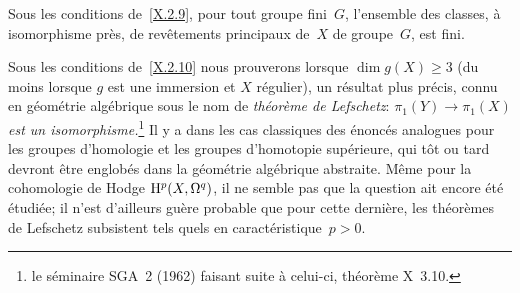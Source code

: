 \begin{corollaire}
\label{X.2.12}
Sous
les conditions de~\ref{X.2.9}, pour tout
groupe fini~$G$, l'ensemble des classes, \`a isomorphisme pr\`es,
de rev\^etements principaux de~$X$ de groupe~$G$, est fini.
\end{corollaire}

\begin{remarque}
\label{X.2.13}
Sous les conditions de~\ref{X.2.10} nous prouverons lorsque $\dim
g(X)\ge 3$ (du moins lorsque $g$ est une immersion et $X$
r\'egulier), un r\'esultat plus pr\'ecis, connu en
g\'eom\'etrie alg\'ebrique sous le nom de
\og \emph{théorème de Lefschetz}\fg: $\pi_1(Y)\to \pi_1(X)$
\emph{est un isomorphisme.}\footnote{\Cf le s\'eminaire SGA~2 (1962)
faisant suite \`a celui-ci, th\'eor\`eme X~3.10.}
Il y a dans les cas classiques des
\'enonc\'es analogues pour les groupes d'homologie et les groupes
d'homotopie sup\'erieure, qui t\^ot ou tard devront \^etre
englob\'es dans la g\'eom\'etrie alg\'ebrique
abstraite. M\^eme pour la cohomologie de Hodge $\mathrm{H}^p(X,\Omega^q)$,
il ne semble pas que la question ait encore \'et\'e
\'etudi\'ee; il n'est d'ailleurs gu\`ere probable que pour cette
derni\`ere, les th\'eor\`emes de Lefschetz subsistent tels quels
en caract\'eristique~$p>0$.
\end{remarque}

